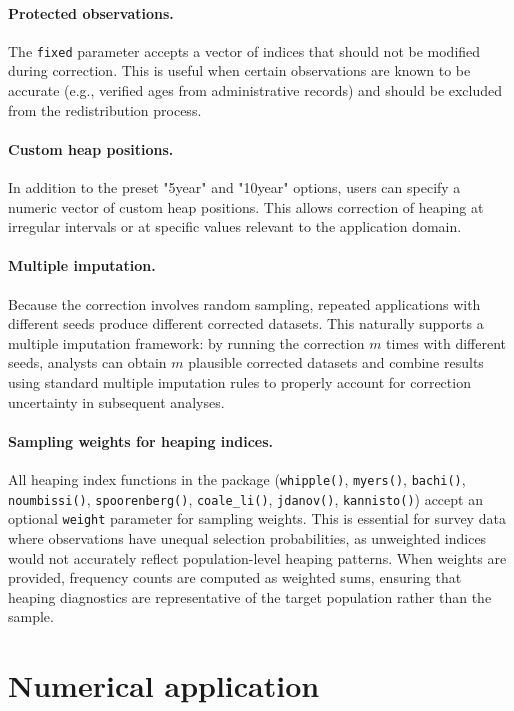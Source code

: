 \documentclass[pdflatex,sn-mathphys-num]{sn-jnl}%
\theoremstyle{thmstyleone}%
\theoremstyle{thmstyletwo}%
\theoremstyle{thmstylethree}%
\begin{document}
\paragraph{Protected observations.} The \texttt{fixed} parameter accepts a vector of indices that should not be modified during correction. This is useful when certain observations are known to be accurate (e.g., verified ages from administrative records) and should be excluded from the redistribution process.

\paragraph{Custom heap positions.} In addition to the preset "5year" and "10year" options, users can specify a numeric vector of custom heap positions. This allows correction of heaping at irregular intervals or at specific values relevant to the application domain.

\paragraph{Multiple imputation.} Because the correction involves random sampling, repeated applications with different seeds produce different corrected datasets. This naturally supports a multiple imputation framework: by running the correction $m$ times with different seeds, analysts can obtain $m$ plausible corrected datasets and combine results using standard multiple imputation rules to properly account for correction uncertainty in subsequent analyses.

\paragraph{Sampling weights for heaping indices.} All heaping index functions in the package (\texttt{whipple()}, \texttt{myers()}, \texttt{bachi()}, \texttt{noumbissi()}, \texttt{spoorenberg()}, \texttt{coale\_li()}, \texttt{jdanov()}, \texttt{kannisto()}) accept an optional \texttt{weight} parameter for sampling weights. This is essential for survey data where observations have unequal selection probabilities, as unweighted indices would not accurately reflect population-level heaping patterns. When weights are provided, frequency counts are computed as weighted sums, ensuring that heaping diagnostics are representative of the target population rather than the sample.


\section{Numerical application}
\end{document}
